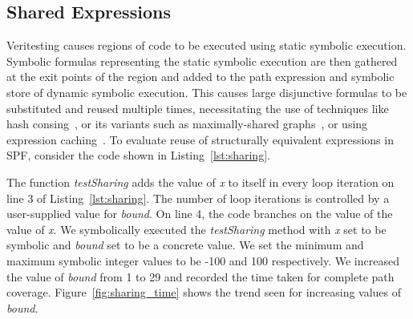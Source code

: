 \subsection{Shared Expressions} 
Veritesting causes regions of code to be executed using static symbolic execution.
%
Symbolic formulas representing the static symbolic execution are then gathered at the exit points of the region and added to the path expression and symbolic store of dynamic symbolic execution.
%
This causes large disjunctive formulas to be substituted and reused multiple times, necessitating the use of techniques like hash consing~\cite{hashconsing}, or its variants such as maximally-shared graphs~\cite{babic}, or using expression caching~\cite{green}.
%
To evaluate reuse of structurally equivalent expressions in SPF, consider the code shown in Listing~\ref{lst:sharing}.
%

%
The function \textit{testSharing} adds the value of \textit{x} to itself in every loop iteration on line 3 of Listing~\ref{lst:sharing}.
%
The number of loop iterations is controlled by a user-supplied value for \textit{bound}.
%
On line 4, the code branches on the value of the value of \textit{x}.
%
We symbolically executed the \textit{testSharing} method with \textit{x} set to be symbolic and \textit{bound} set to be a concrete value.
%
We set the minimum and maximum symbolic integer values to be -100 and 100 respectively.
%
We increased the value of \textit{bound} from 1 to 29 and recorded the time taken for complete path coverage.
%
Figure~\ref{fig:sharing_time} shows the trend seen for increasing values of \textit{bound}.
%
